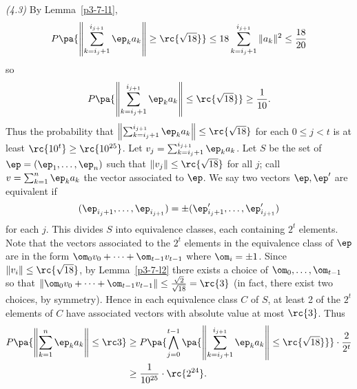\begin{problem} {\it (4.3)}
By Lemma~\ref{p3-7-l1},
\[
P\pa{\left\Vert\sum_{k=i_j+1}^{i_{j+1}} \ep_ka_k\right\Vert\ge \rc{\sqrt {18}}}\le18\sum_{k=i_j+1}^{i_{j+1}} \Vert a_k\Vert^2\le \frac{18}{20}
\]
so 
\[
P\pa{\left\Vert\sum_{k=i_j+1}^{i_{j+1}} \ep_ka_k\right\Vert\le \rc{\sqrt {18}}}\ge \frac{1}{10}.
\]
Thus the probability that $\left\Vert\sum_{k=i_j+1}^{i_{j+1}} \ep_ka_k\right\Vert\le \rc{\sqrt {18}}$ for each $0\le j<t$ is at least $\rc{10^t}\ge \rc{10^{25}}$. 
Let $v_j=\sum_{k=i_j+1}^{i_{j+1}} \ep_ka_k$. 
Let $S$ be the set of $\ep=(\ep_1,\ldots, \ep_n)$ such that $\left\Vert v_j\right\Vert\le \rc{\sqrt {18}}$ for all $j$; call $v=\sum_{k=1}^n \ep_ka_k$ the vector associated to $\ep$. 
We say two vectors $\ep,\ep'$ are equivalent if
\[
(\ep_{i_j+1},\ldots, \ep_{i_{j+1}})=\pm(\ep_{i_j+1}',\ldots, \ep_{i_{j+1}}')
\]
for each $j$. This divides $S$ into equivalence classes, each containing $2^t$ elements. Note that the vectors associated to the $2^t$ elements in the equivalence class of $\ep$ are in the form $\om_0v_0+\cdots +\om_{t-1}v_{t-1}$ where $\om_i=\pm 1$. Since $\Vert v_i\Vert \le \rc{\sqrt{18}}$, by Lemma~\ref{p3-7-l2} there exists a choice of $\om_0,\ldots, \om_{t-1}$ so that $\Vert \om_0v_0+\cdots+ \om_{t-1}v_{t-1}\Vert \le\frac{\sqrt 2}{\sqrt{18}}=\rc{3}$ (in fact, there exist two choices, by symmetry). Hence in each equivalence class $C$ of $S$, at least 2 of the $2^t$ elements of $C$ have associated vectors with absolute value at most $\rc{3}$. Thus
\begin{align*}
P\pa{
\left\Vert\sum_{k=1}^n \ep_ka_k\right\Vert\le \rc 3
}&\ge P\pa{\bigwedge_{j=0}^{t-1}\pa{\left\Vert\sum_{k=i_j+1}^{i_{j+1}} \ep_ka_k\right\Vert\le \rc{\sqrt {18}}}}\cdot \frac{2}{2^t}\\
&\ge\frac{1}{10^{25}}\cdot \rc{2^{24}}.
\end{align*}
\end{problem}
